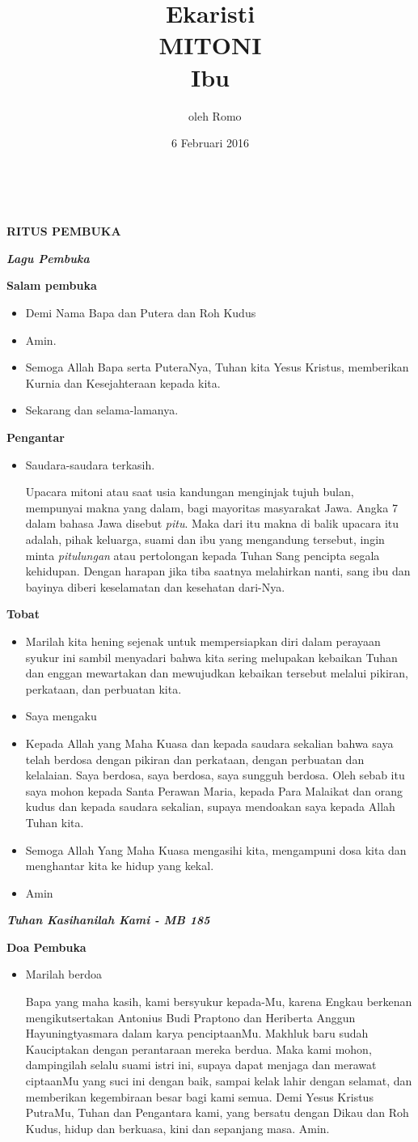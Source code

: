\documentclass[12pt,twoside]{book}
\title{Ekaristi \vspace{1cm}\\MITONI\\ 
Ibu \calonibu \\ 
}
\author{
{~}\vspace{4cm}
oleh Romo \romo
}
\date{6 Februari 2016}
\makeatletter
\newcommand{\judul}[1]{%
  {\parindent \z@ \centering \normalfont
    \interlinepenalty\@M \large \bfseries #1\par\nobreak \vskip 20\p@ }}
\newcommand{\subjudul}[1]{%
  {\parindent \z@ \normalfont
    \interlinepenalty\@M \bfseries #1\par\nobreak \vskip 20\p@ }}
\newcommand{\lagu}[1]{%
  {\parindent \z@ \normalfont
    \interlinepenalty\@M \bfseries \emph{#1}\par\nobreak \vskip 20\p@ }}
\newcommand{\BU}[1]{\begin{itemize} \item[U:] #1 \end{itemize}}
\newcommand{\BI}[1]{\begin{itemize} \item[I:] #1 \end{itemize}}
\newcommand{\calonibu}{Heriberta Anggun Hayuningtyasmara\xspace}
\newcommand{\calonayah}{Antonius Budi Praptono\xspace}
\makeatother
\begin{document}
\maketitle
\Large  
\thispagestyle{empty}
{~}\newpage
\thispagestyle{empty}
\judul{RITUS PEMBUKA}
\lagu{Lagu Pembuka}


\subjudul{Salam pembuka}

\BI{Demi Nama Bapa dan Putera dan Roh Kudus}
\BU{Amin.}
\BI{Semoga Allah Bapa serta PuteraNya, Tuhan kita Yesus Kristus, memberikan Kurnia dan Kesejahteraan kepada kita.}
\BU{Sekarang dan selama-lamanya.}

\subjudul{Pengantar}

\BI{Saudara-saudara terkasih. 

Upacara mitoni atau saat usia kandungan menginjak tujuh bulan, mempunyai makna yang dalam, bagi mayoritas masyarakat Jawa. Angka 7 dalam bahasa Jawa disebut \textit{pitu}. Maka dari itu makna di balik upacara itu adalah, pihak keluarga, suami dan ibu yang mengandung tersebut, ingin minta \textit{pitulungan} atau pertolongan kepada Tuhan Sang pencipta segala kehidupan. Dengan harapan jika tiba saatnya melahirkan nanti, sang ibu dan bayinya diberi keselamatan dan kesehatan dari-Nya.
}

\subjudul{Tobat}
\BI{Marilah kita hening sejenak untuk mempersiapkan diri dalam perayaan syukur ini sambil menyadari bahwa kita sering melupakan kebaikan Tuhan dan enggan mewartakan dan mewujudkan kebaikan tersebut melalui pikiran, perkataan, dan perbuatan kita.}

\BI{Saya mengaku}

\BU{Kepada Allah yang Maha Kuasa dan kepada saudara sekalian bahwa saya telah berdosa dengan pikiran dan perkataan, dengan perbuatan dan kelalaian. Saya berdosa, saya berdosa, saya sungguh berdosa. Oleh sebab itu saya mohon kepada Santa Perawan Maria, kepada Para Malaikat dan orang kudus dan kepada saudara sekalian, supaya mendoakan saya kepada Allah Tuhan kita.}

\BI{Semoga Allah Yang Maha Kuasa mengasihi kita, mengampuni dosa kita dan menghantar kita ke hidup yang kekal.}

\BU{Amin}

\lagu{Tuhan Kasihanilah Kami - MB 185}

\subjudul{Doa Pembuka}

\BI{Marilah berdoa

Bapa yang maha kasih, kami bersyukur kepada-Mu, karena Engkau berkenan mengikutsertakan \calonayah dan \calonibu dalam karya penciptaanMu. Makhluk baru sudah Kauciptakan dengan perantaraan mereka berdua. Maka kami mohon, dampingilah selalu suami istri ini, supaya dapat menjaga dan merawat ciptaanMu yang suci ini dengan baik, sampai kelak lahir dengan selamat, dan memberikan kegembiraan besar bagi kami semua. Demi Yesus Kristus PutraMu, Tuhan dan Pengantara kami, yang bersatu dengan Dikau dan Roh Kudus, hidup dan berkuasa, kini dan sepanjang masa.
Amin.}
\end{document}
